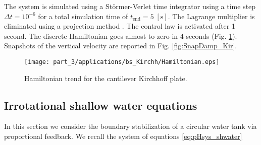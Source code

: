 The system is simulated using a St\"ormer-Verlet time integrator \cite{hairer2003geometric} using a time step $\Delta t = 10^{-6}$ for a total simulation time of $t_{\text{end}} = 5 \; \mathrm{[s]}$. The Lagrange multiplier is eliminated using a projection method \cite{benner2015time}. The control law is activated after 1 second. The discrete Hamiltonian goes almost to zero in 4 seconds (Fig. \ref{fig:H_bs_Kirchhoff}). Snapshots of the vertical velocity are reported in Fig. \ref{fig:SnapDamp_Kir}. 


\begin{figure}[htb]
	\centering
	\texttt{[image: part\_3/applications/bs\_Kirchh/Hamiltonian.eps]}
	\caption{Hamiltonian trend for the cantilever Kirchhoff plate.}
	\label{fig:H_bs_Kirchhoff}
\end{figure}

\begin{figure*}[p]
	\centering
	\hfil
	\hfil
	\hfil
	\hfil
	\caption{Snapshots at different times of the simulation of the boundary controlled cantilever Kirchhoff plate.}
	\label{fig:SnapDamp_Kir}
	\hfil
\end{figure*}



\subsection{Irrotational shallow water equations}\label{sec:bd_stab_SW}
In this section we consider the boundary stabilization of a circular water tank via proportional feedback. We recall the system of equations \eqref{eq:pHsys_shwater}

